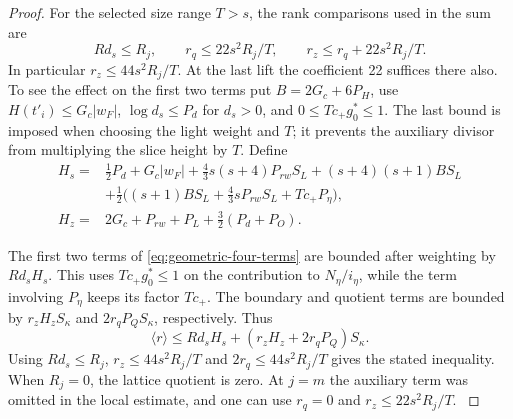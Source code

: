 \begin{proof}
For the selected
size range \(T>s\), the rank comparisons used in the sum are
\[
 R d_s\le R_j,\qquad
 r_q\le 22s^2 R_j/T,\qquad
 r_z\le r_q+22s^2 R_j/T .
\]
In particular \(r_z\le44s^2 R_j/T\). At the last lift the
coefficient 22 suffices there also. To see the effect on the
first two terms put \(B=2G_c+6P_H\), use
\(H(t'_i)\le G_c|w_F|\), \(\log d_s\le P_d\) for \(d_s>0\),
and \(0\le Tc_+g_0^*\le1\). The last bound is imposed when
choosing the light weight and \(T\); it prevents the auxiliary
divisor from multiplying the slice height by \(T\). Define
\begin{equation}\label{eq:slice-height-price-constants}\begin{aligned}
 H_s={}&\tfrac12 P_d+G_c |w_F|
 +\tfrac43 s(s+4)P_{rw} S_L+(s+4)(s+1)B S_L\\
 &+\tfrac12\big((s+1) B S_L+\tfrac43 s P_{rw} S_L
                           +Tc_+P_\eta\big),\\
 H_z={}&2G_c+P_{rw}+P_L+\tfrac32(P_d+P_O).
\end{aligned}\end{equation}

The first two terms of \eqref{eq:geometric-four-terms} are
bounded after weighting by \(Rd_s H_s\). This uses
\(Tc_+g_0^*\le1\) on the contribution to
\(N_\eta/i_\eta\), while the term involving \(P_\eta\)
keeps its factor \(Tc_+\). The boundary and quotient terms
are bounded by \(r_z H_z S_\kappa\) and
\(2r_q P_Q S_\kappa\), respectively. Thus
\[
 \langle r\rangle
 \le R d_s H_s+(r_z H_z+2r_qP_Q)S_\kappa .
\]
Using \(Rd_s\le R_j\), \(r_z\le44s^2R_j/T\) and
\(2r_q\le44s^2R_j/T\) gives the stated inequality. When
\(R_j=0\), the lattice quotient is zero. At \(j=m\) the
auxiliary term was omitted in the local estimate, and one can
use \(r_q=0\) and \(r_z\le22s^2R_j/T\).
\label{cor:run-index-length-2}

\end{proof}


















